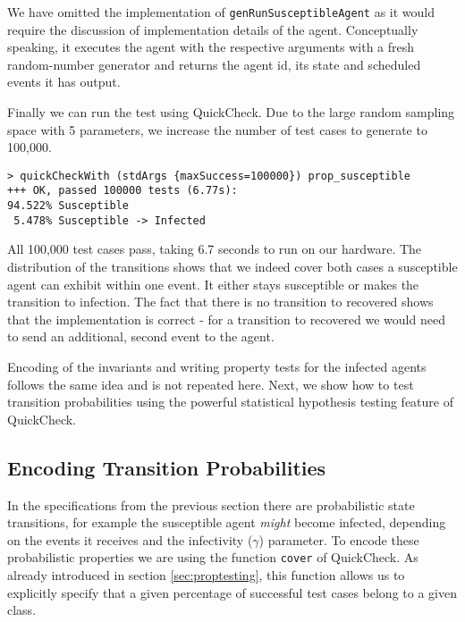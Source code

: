 We have omitted the implementation of \texttt{genRunSusceptibleAgent} as it would require the discussion of implementation details of the agent. Conceptually speaking, it executes the agent with the respective arguments with a fresh random-number generator and returns the agent id, its state and scheduled events it has output.

Finally we can run the test using QuickCheck. Due to the large random sampling space with 5 parameters, we increase the number of test cases to generate to 100,000.

\begin{footnotesize}
\begin{verbatim}
> quickCheckWith (stdArgs {maxSuccess=100000}) prop_susceptible
+++ OK, passed 100000 tests (6.77s):
94.522% Susceptible
 5.478% Susceptible -> Infected
\end{verbatim}
\end{footnotesize}

All 100,000 test cases pass, taking 6.7 seconds to run on our hardware. The distribution of the transitions shows that we indeed cover both cases a susceptible agent can exhibit within one event. It either stays susceptible or makes the transition to infection. The fact that there is no transition to recovered shows that the implementation is correct - for a transition to recovered we would need to send an additional, second event to the agent.

Encoding of the invariants and writing property tests for the infected agents follows the same idea and is not repeated here. Next, we show how to test transition probabilities using the powerful statistical hypothesis testing feature of QuickCheck.

\subsection{Encoding Transition Probabilities}
In the specifications from the previous section there are probabilistic state transitions, for example the susceptible agent \textit{might} become infected, depending on the events it receives and the infectivity ($\gamma$) parameter. To encode these probabilistic properties we are using the function \texttt{cover} of QuickCheck. As already introduced in section \ref{sec:proptesting}, this function allows us to explicitly specify that a given percentage of successful test cases belong to a given class.


